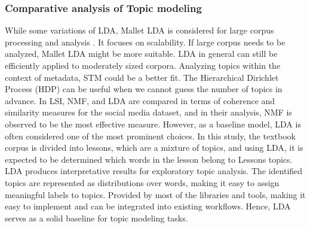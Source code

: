 \documentclass[sn-mathphys,Numbered]{sn-jnl}%
\theoremstyle{thmstyleone}%
\theoremstyle{thmstyletwo}%
\theoremstyle{thmstylethree}%
\begin{document}
\subsubsection{Comparative analysis of Topic modeling} 
While some variations of LDA, Mallet LDA is considered for large corpus processing and analysis \cite{vayansky2020review, abdelrazek2022topic, Comparison_Topic_Modeling_Algorithms}. It focuses on scalability. If large corpus needs to be analyzed, Mallet LDA might be more suitable. LDA in general can still be efficiently applied to moderately sized corpora. Analyzing topics within the context of metadata, STM could be a better fit. The Hierarchical Dirichlet Process (HDP) can be useful when we cannot guess the number of topics in advance. In \cite{Comparison_Topic_Modeling_Algorithms} LSI, NMF, and LDA are compared in terms of coherence and similarity measures for the social media dataset, and in their analysis, NMF is observed to be the most effective measure. However, as a baseline model, LDA is often considered one of the most prominent choices. In this study, the textbook corpus is divided into lessons, which are a mixture of topics, and using LDA, it is expected to be determined which words in the lesson belong to Lesson\textquotesingle s topics. LDA produces interpretative results for exploratory topic analysis. The identified topics are represented as distributions over words, making it easy to assign meaningful labels to topics. Provided by most of the libraries and tools, making it easy to implement and can be integrated into existing workflows. Hence, LDA serves as a solid baseline for topic modeling tasks. 
\end{document}
